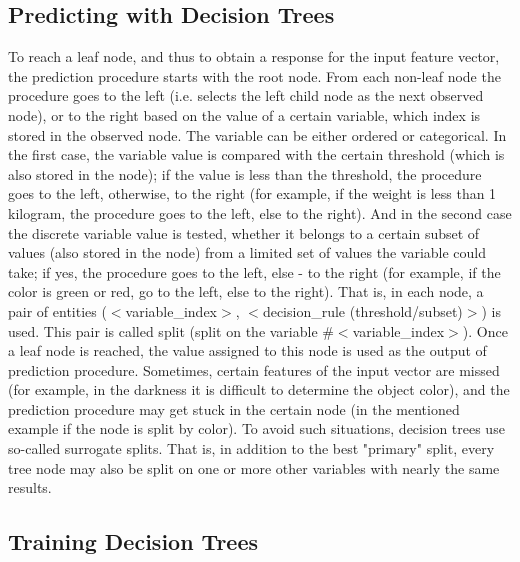 \subsection{Predicting with Decision Trees}

To reach a leaf node, and thus to obtain a response for the input feature vector, the prediction procedure starts with the root node. From each non-leaf node the procedure goes to the left (i.e. selects the left child node as the next observed node), or to the right based on the value of a certain variable, which index is stored in the observed node. The variable can be either ordered or categorical. In the first case, the variable value is compared with the certain threshold (which is also stored in the node); if the value is less than the threshold, the procedure goes to the left, otherwise, to the right (for example, if the weight is less than 1 kilogram, the procedure goes to the left, else to the right). And in the second case the discrete variable value is tested, whether it belongs to a certain subset of values (also stored in the node) from a limited set of values the variable could take; if yes, the procedure goes to the left, else - to the right (for example, if the color is green or red, go to the left, else to the right). That is, in each node, a pair of entities ($<$variable\_index$>$, $<$decision\_rule (threshold/subset)$>$) is used. This pair is called split (split on the variable \#$<$variable\_index$>$). Once a leaf node is reached, the value assigned to this node is used as the output of prediction procedure.
\newline
\newline
Sometimes, certain features of the input vector are missed (for example, in the darkness it is difficult to determine the object color), and the prediction procedure may get stuck in the certain node (in the mentioned example if the node is split by color). To avoid such situations, decision trees use so-called surrogate splits. That is, in addition to the best "primary" split, every tree node may also be split on one or more other variables with nearly the same results.

\subsection{Training Decision Trees}

